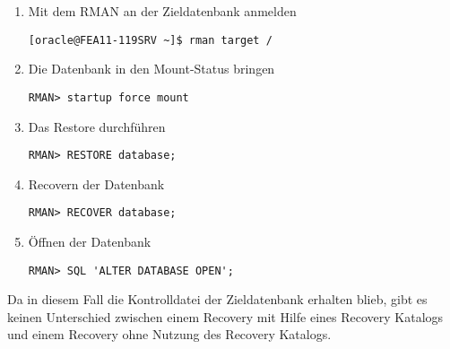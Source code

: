         \begin{enumerate}
          \item Mit dem RMAN an der Zieldatenbank anmelden
            \begin{lstlisting}[caption={An der Zieldatenbank anmelden},label=admin1440,language=rman]
[oracle@FEA11-119SRV ~]$ rman target /
            \end{lstlisting}
          \item Die Datenbank in den Mount-Status bringen
            \begin{lstlisting}[caption={Datenbank mounten},label=admin1441,language=rman,alsolanguage=sqlplus]
RMAN> startup force mount
          \end{lstlisting}
          \item Das Restore durchführen
            \begin{lstlisting}[caption={Restore der Datendateien},label=admin1442,language=rman]
RMAN> RESTORE database;
            \end{lstlisting}
          \item Recovern der Datenbank
            \begin{lstlisting}[caption={Recovery der Datenbank},label=admin1443,language=rman]
RMAN> RECOVER database;
            \end{lstlisting}
          \item Öffnen der Datenbank
            \begin{lstlisting}[caption={Öffnen der Datenbank nach dem Recovery},label=admin1444,language=rman,emph={[10]ALTER,DATABASE,OPEN},emphstyle={[10]\color{magenta}\bfseries}]
RMAN> SQL 'ALTER DATABASE OPEN';
            \end{lstlisting}
        \end{enumerate}
        \begin{merke}
          Da in diesem Fall die Kontrolldatei der Zieldatenbank erhalten blieb,
          gibt es keinen Unterschied zwischen einem Recovery mit Hilfe eines
          Recovery Katalogs und einem Recovery ohne Nutzung des Recovery
          Katalogs.
        \end{merke}
